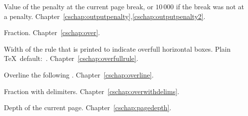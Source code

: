 \begin{glossinventory}
\item [\cs{outputpenalty}]  
      Value of the penalty at the current page break,
      or $10\,000$ if the break was not at a penalty.
Chapter~\ref{cschap:outputpenalty},\ref{cschap:outputpenalty2}.

\item [\cs{over}]
      Fraction.
Chapter~\ref{cschap:over}.

\item [\cs{overfullrule}]
      Width of the rule that is printed to indicate 
      overfull horizontal boxes.
      Plain \TeX\ default:~\n{5pt}.
Chapter~\ref{cschap:overfullrule}.

\item [\cs{overline\gr{math field}}]
      Overline the following .
Chapter~\ref{cschap:overline}.

\item [\cs{overwithdelims\gr{delim$_1$}\gr{delim$_2$}}]
      Fraction with delimiters.
Chapter~\ref{cschap:overwithdelims}.

\item [\cs{pagedepth}]
      Depth of the current page.
Chapter~\ref{cschap:pagedepth}.


\end{glossinventory}

